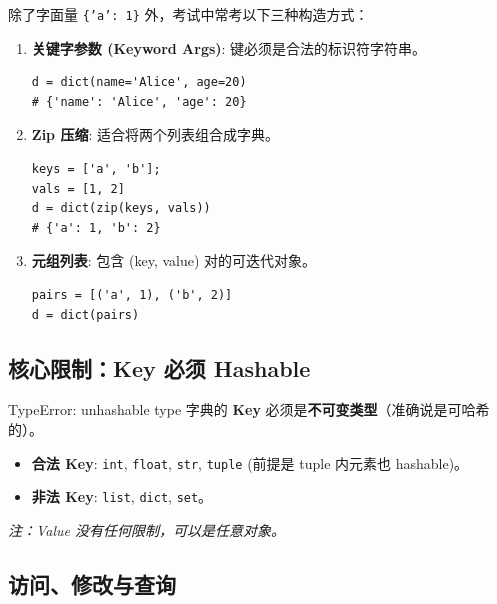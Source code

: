 \documentclass[12pt, a4paper]{article}
\begin{document}
除了字面量 \texttt{\{'a': 1\}} 外，考试中常考以下三种构造方式：

\begin{enumerate}
    \item \textbf{关键字参数 (Keyword Args)}: 键必须是合法的标识符字符串。
    \begin{lstlisting}
d = dict(name='Alice', age=20) 
# {'name': 'Alice', 'age': 20}
    \end{lstlisting}
    
    \item \textbf{Zip 压缩}: 适合将两个列表组合成字典。
    \begin{lstlisting}
keys = ['a', 'b'];
vals = [1, 2]
d = dict(zip(keys, vals))
# {'a': 1, 'b': 2}
    \end{lstlisting}
    
    \item \textbf{元组列表}: 包含 (key, value) 对的可迭代对象。
    \begin{lstlisting}
pairs = [('a', 1), ('b', 2)]
d = dict(pairs)
    \end{lstlisting}
\end{enumerate}

\subsection{核心限制：Key 必须 Hashable}

\begin{trapbox}{TypeError: unhashable type}
字典的 \textbf{Key} 必须是\textbf{不可变类型}（准确说是可哈希的）。
\begin{itemize}
    \item \textbf{合法 Key}: \texttt{int}, \texttt{float}, \texttt{str}, \texttt{tuple} (前提是 tuple 内元素也 hashable)。
    \item \textbf{非法 Key}: \texttt{list}, \texttt{dict}, \texttt{set}。
\end{itemize}
\textit{注：Value 没有任何限制，可以是任意对象。}
\end{trapbox}

\subsection{访问、修改与查询}
\end{document}
